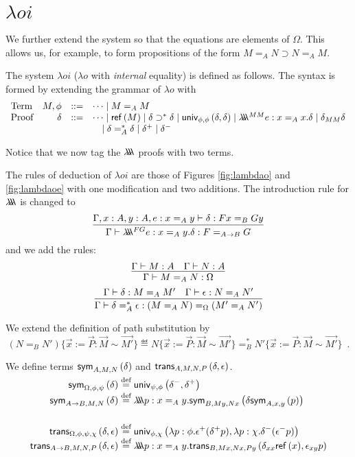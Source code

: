 





\section{$\lambda o i$}

We further extend the system so that the equations are elements of $\Omega$.  This allows us, for example,
to form propositions of the form $M =_A N \supset N =_A M$.

The system $\lambda o i$ ($\lambda o$ with \emph{internal} equality) is defined as follows.  The
syntax is formed by extending the grammar of $\lambda o$ with
\[
\begin{array}{lrcl}
\text{Term} & M, \phi & ::= & \cdots \mid M =_A M \\
\text{Proof} & \delta & ::= & \cdots \mid \mathsf{ref} \left( {M} \right) \mid \delta \supset^* \delta \mid \mathsf{univ}_{{\phi} , {\phi}} \left( {\delta} , {\delta} \right) \mid \lambda \!\! \lambda \!\! \lambda^{MM} e : x =_A x . \delta \mid \delta_{MM} \delta\\
& & & \quad \mid \delta =^*_A \delta \mid \delta^+ \mid \delta^-
\end{array}
\]

Notice that we now tag the $\lambda \!\! \lambda \!\! \lambda$ proofs with two terms.

The rules of deduction of $\lambda o i$ are those of Figures \ref{fig:lambdao} and \ref{fig:lambdaoe} with one modification and two additions.  The introduction rule for $\lambda \!\! \lambda \!\! \lambda$ is changed to %
\[ \infer{\Gamma \vdash \triplelambda^{FG} e : x =_A y . \delta : F =_{A \rightarrow B} G}
{\Gamma, x : A, y : A, e : x =_A y \vdash \delta : F x =_B G y} \]
and we add the rules:
\[ \infer{\Gamma \vdash M =_A N : \Omega}{\Gamma \vdash M : A \quad \Gamma \vdash N : A} \]
\[ \infer{\Gamma \vdash \delta =^*_A \epsilon : (M =_A N) =_\Omega (M' =_A N')}
{\Gamma \vdash \delta : M =_A M' \quad \Gamma \vdash \epsilon : N =_A N'} \]

We extend the definition of path substitution by
\[ (N =_B N') \{ \vec{x} := \vec{P} : \vec{M} \sim \vec{M'} \}
\eqdef N \{ \vec{x} := \vec{P} : \vec{M} \sim \vec{M'} \} =_B^*
N' \{ \vec{x} := \vec{P} : \vec{M} \sim \vec{M'} \} \enspace . \]

We define terms $\mathsf{sym}_{{A},{M},{N}} \left( {\delta} \right)$ and $\mathsf{trans}_{{A},{M},{N},{P}} \left( {\delta} , {\epsilon} \right)$.
\begin{align*}
\sym{\Omega}{\phi}{\psi}{\delta} & \eqdef \univ{\psi}{\phi}{\delta^-}{\delta^+} \\
\sym{A \rightarrow B}{M}{N}{\delta} & \eqdef \triplelambda p:x =_A y. \sym{B}{My}{Nx}{\delta
\sym{A}{x}{y}{p}} \\
& \\
\trans{\Omega}{\phi}{\psi}{\chi}{\delta}{\epsilon} & \eqdef \univ{\phi}{\chi}
{\lambda p:\phi.\epsilon^+(\delta^+ p)}{\lambda p:\chi.\delta^-(\epsilon^- p)} \\
\trans{A \rightarrow B}{M}{N}{P}{\delta}{\epsilon}
& \eqdef \triplelambda p:x =_A y. \trans{B}{Mx}{Nx}{Py}{\delta_{xx} \reff{x}}{\epsilon_{xy} p}
\end{align*}

